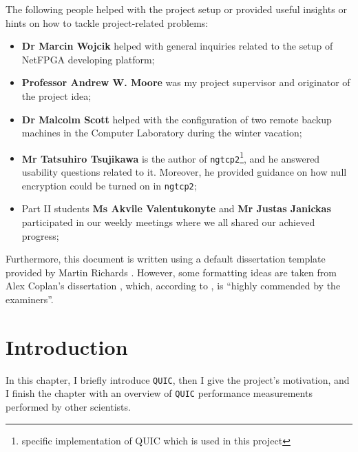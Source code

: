 \documentclass[12pt,a4paper,twoside,openright]{report}
\begin{document}
The following people helped with the project setup or provided useful insights or hints on how to tackle project-related problems:
\begin{itemize}
    \item \textbf{Dr Marcin Wojcik} helped with general inquiries related to the setup of NetFPGA developing platform;
    \item \textbf{Professor Andrew W. Moore} was my project supervisor and originator of the project idea;
    \item \textbf{Dr Malcolm Scott} helped with the configuration of two remote backup machines in the Computer Laboratory during the winter vacation;
    \item \textbf{Mr Tatsuhiro Tsujikawa} is the author of \texttt{ngtcp2}\footnote{specific implementation of QUIC which is used in this project}, and he answered usability questions related to it. Moreover, he provided guidance on how null encryption could be turned on in \texttt{ngtcp2};
    \item Part II students \textbf{Ms Akvile Valentukonyte} and \textbf{Mr Justas Janickas} participated in our weekly meetings where we all shared our achieved progress;
\end{itemize}

Furthermore, this document is written using a default dissertation template provided by Martin Richards \cite{how_to_write_a_dissertation_in_LATEX}.
However, some formatting ideas are taken from Alex Coplan's dissertation \cite{Alex_Coplan_dissertation}, which, according to \cite{Computer_Lab_dissertations}, is \enquote{highly commended by the examiners}.


\pagestyle{headings}

\chapter{Introduction}
In this chapter, I briefly introduce \texttt{QUIC}, then I give the project's motivation, and I finish the chapter with an overview of \texttt{QUIC} performance measurements performed by other scientists.

%
\end{document}
